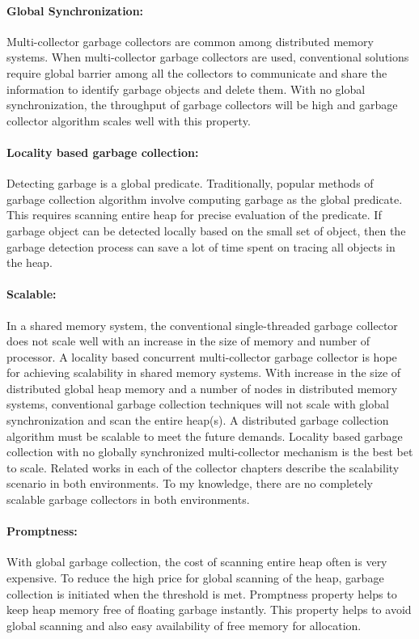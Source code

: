 \paragraph{Global Synchronization:}
Multi-collector garbage collectors are common among distributed memory systems. 
When multi-collector garbage collectors are used, conventional solutions require global barrier among all the collectors to communicate and share the information to identify garbage objects and delete them. With no global synchronization, the throughput of garbage collectors will be high and garbage collector algorithm scales well with this property.
\paragraph{Locality based garbage collection:}
Detecting garbage is a global predicate. Traditionally, popular methods of garbage collection algorithm involve computing garbage as the global predicate. This requires scanning entire heap for precise evaluation of the predicate. If garbage object can be detected locally based on the small set of object, then the garbage detection process can save a lot of time spent on tracing all objects in the heap.
\paragraph{Scalable:}
In a shared memory system, the conventional single-threaded garbage collector does not scale well with an increase in the size of memory and number of processor. A locality based concurrent multi-collector garbage collector is hope for achieving scalability in shared memory systems.
With increase in the size of distributed global heap memory and  a number of nodes in distributed memory systems, conventional garbage collection techniques will not scale with global synchronization and scan the entire heap(s). A distributed garbage collection algorithm must be scalable to meet the future demands. Locality based garbage collection with no globally synchronized multi-collector mechanism is the best bet to scale. Related works in each of the collector chapters describe the scalability scenario in both environments. To my knowledge, there are no completely scalable garbage collectors in both environments.
\paragraph{Promptness:}
With global garbage collection, the cost of scanning entire heap often is very expensive. To reduce the high price for global scanning of the heap, garbage collection is initiated when the threshold is met. Promptness property helps to keep heap memory free of floating garbage instantly. This property helps to avoid global scanning and also easy availability of free memory for allocation.
